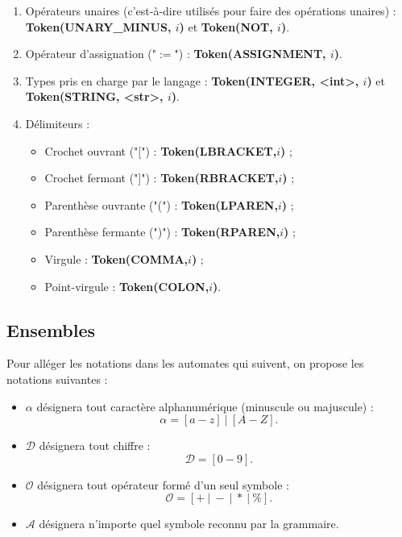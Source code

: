 \documentclass[a4paper, 12pt]{report}
\begin{document}
\begin{enumerate}
\item Opérateurs unaires (c'est-à-dire utilisés pour faire des opérations unaires) : \textbf{Token(UNARY{\_}MINUS, $i$)} et \textbf{Token(NOT, $i$)}.\\

\item Opérateur d'assignation ("$:=$") : \textbf{Token(ASSIGNMENT, $i$)}.\\

\item Types pris en charge par le langage : \textbf{Token(INTEGER, <int>, $i$)} et \textbf{Token(STRING, <str>, $i$)}.\\

\item Délimiteurs :
\begin{itemize}
\item Crochet ouvrant ("[") : \textbf{Token(LBRACKET,$i$)} ;
\item Crochet fermant ("]") : \textbf{Token(RBRACKET,$i$)} ;
\item Parenthèse ouvrante ("(") : \textbf{Token(LPAREN,$i$)} ;
\item Parenthèse fermante (")") : \textbf{Token(RPAREN,$i$)} ;
\item Virgule : \textbf{Token(COMMA,$i$)} ;
\item Point-virgule : \textbf{Token(COLON,$i$)}.\\
\end{itemize}

\end{enumerate}

\subsection{Ensembles}

Pour alléger les notations dans les automates qui suivent, on propose les notations suivantes :
\begin{itemize}[label=-]

\item $\alpha$ désignera tout caractère alphanumérique (minuscule ou majuscule) :
\[ \alpha = [a-z] \ | \ [A-Z]. \]

\item $\mathcal{D}$ désignera tout chiffre :
\[ \mathcal{D} = [0-9]	. \]

\item $\mathcal{O}$ désignera tout opérateur formé d'un seul symbole :
\[ \mathcal{O} = [+ \ | \ - \ | \ * \ | \ \% ]	. \]

\item $\mathcal{A}$ désignera n'importe quel symbole reconnu par la grammaire.

\end{itemize}
\end{document}
